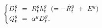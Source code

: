 \begin{equation}
\begin{cases}
    \begin{split}
        D_{t}^{g} \
        & = \ R_{t}^{g} h_{t}^{g} \hspace{0.2cm} (= -\dot{R}_{t}^{g} \ + \ E^{g}) \\
        Q_{t}^{g} \
        & = \ \alpha^{g} D_{t}^{g}.
    \end{split}
\end{cases}
\label{Equation:Firms-Problem_Aggregate-Drilling-and-Production}
\end{equation}